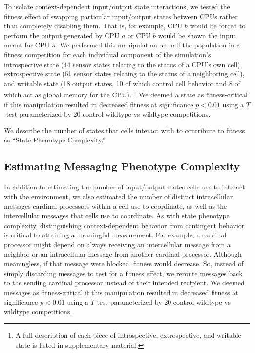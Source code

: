 To isolate context-dependent input/output state interactions, we tested the fitness effect of swapping particular input/output states between CPUs rather than completely disabling them.
That is, for example, CPU $b$ would be forced to perform the output generated by CPU $a$ or CPU $b$ would be shown the input meant for CPU $a$.
We performed this manipulation on half the population in a fitness competition for each individual component of the simulation's introspective state (44 sensor states relating to the status of a CPU's own cell), extrospective state (61 sensor states relating to the status of a neighboring cell), and writable state (18 output states, 10 of which control cell behavior and 8 of which act as global memory for the CPU).%
\footnote{
A full description of each piece of introspective, extrospective, and writable state is listed in supplementary material.
}
We deemed a state as fitness-critical if this manipulation resulted in decreased fitness at significance $p < 0.01$ using a $T$-test parameterized by 20 control wildtype vs wildtype competitions.

We describe the number of states that cells interact with to contribute to fitness as ``State Phenotype Complexity.''

\subsection{Estimating Messaging Phenotype Complexity}
\label{sec:estimating-messaging-interface-complexity;ch:measuring-cna}

In addition to estimating the number of input/output states cells use to interact with the environment, we also estimated the number of distinct intracellular messages cardinal processors within a cell use to coordinate, as well as the intercellular messages that cells use to coordinate.
As with state phenotype complexity, distinguishing context-dependent behavior from contingent behavior is critical to attaining a meaningful measurement.
For example, a cardinal processor might depend on always receiving an intercellular message from a neighbor or an intracellular message from another cardinal processor.
Although meaningless, if that message were blocked, fitness would decrease.
So, instead of simply discarding messages to test for a fitness effect, we reroute messages back to the sending cardinal processor instead of their intended recipient.
We deemed messages as fitness-critical if this manipulation resulted in decreased fitness at significance $p < 0.01$ using a $T$-test parameterized by 20 control wildtype vs wildtype competitions.

